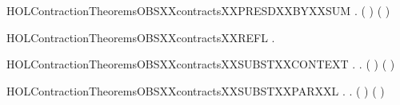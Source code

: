 \newcommand{\HOLContractionTheoremsOBSXXcontractsXXPRESDXXBYXXPAR}{\UseVerbatim{HOLContractionTheoremsOBSXXcontractsXXPRESDXXBYXXPAR}}
\begin{SaveVerbatim}{HOLContractionTheoremsOBSXXcontractsXXPRESDXXBYXXSUM}
\HOLTokenTurnstile{} \HOLSymConst{\HOLTokenForall{}}   .
          \HOLSymConst{\HOLTokenConj{}}    \HOLSymConst{\HOLTokenImp{}}
        ( \HOLSymConst{+} ) ( \HOLSymConst{+} )
\end{SaveVerbatim}
\newcommand{\HOLContractionTheoremsOBSXXcontractsXXPRESDXXBYXXSUM}{\UseVerbatim{HOLContractionTheoremsOBSXXcontractsXXPRESDXXBYXXSUM}}
\begin{SaveVerbatim}{HOLContractionTheoremsOBSXXcontractsXXREFL}
\HOLTokenTurnstile{} \HOLSymConst{\HOLTokenForall{}}.   
\end{SaveVerbatim}
\newcommand{\HOLContractionTheoremsOBSXXcontractsXXREFL}{\UseVerbatim{HOLContractionTheoremsOBSXXcontractsXXREFL}}
\begin{SaveVerbatim}{HOLContractionTheoremsOBSXXcontractsXXSUBSTXXCONTEXT}
\HOLTokenTurnstile{} \HOLSymConst{\HOLTokenForall{}} .
          \HOLSymConst{\HOLTokenImp{}}
       \HOLSymConst{\HOLTokenForall{}}.   \HOLSymConst{\HOLTokenImp{}}  ( ) ( )
\end{SaveVerbatim}
\newcommand{\HOLContractionTheoremsOBSXXcontractsXXSUBSTXXCONTEXT}{\UseVerbatim{HOLContractionTheoremsOBSXXcontractsXXSUBSTXXCONTEXT}}
\begin{SaveVerbatim}{HOLContractionTheoremsOBSXXcontractsXXSUBSTXXPARXXL}
\HOLTokenTurnstile{} \HOLSymConst{\HOLTokenForall{}} .
          \HOLSymConst{\HOLTokenImp{}}
       \HOLSymConst{\HOLTokenForall{}}.  ( \HOLSymConst{\ensuremath{\parallel}} ) ( \HOLSymConst{\ensuremath{\parallel}} )
\end{SaveVerbatim}
